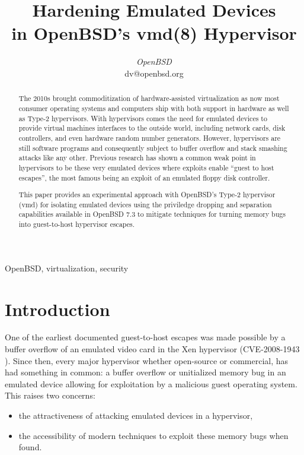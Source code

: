 \documentclass[conference]{IEEEtran}
\begin{document}
\title{Hardening Emulated Devices \\ in OpenBSD's vmd(8) Hypervisor}

\author{
\textit{OpenBSD}\\
dv@openbsd.org}

\maketitle

\begin{abstract}
The 2010s brought commoditization of hardware-assisted virtualization
as now most consumer operating systems and computers ship with both
support in hardware as well as Type-2 hypervisors. With hypervisors
comes the need for emulated devices to provide virtual machines
interfaces to the outside world, including network cards, disk
controllers, and even hardware random number generators. However,
hypervisors are still software programs and consequently subject to
buffer overflow and stack smashing attacks like any other. Previous
research has shown a common weak point in hypervisors to be these very
emulated devices where exploits enable ``guest to host escapes'', the
most famous being an exploit of an emulated floppy disk controller.

This paper provides an experimental approach with OpenBSD's Type-2
hypervisor (vmd) for isolating emulated devices using the priviledge
dropping and separation capabilities available in OpenBSD 7.3 to
mitigate techniques for turning memory bugs into guest-to-host
hypervisor escapes.
\end{abstract}


\begin{IEEEkeywords}
OpenBSD, virtualization, security
\end{IEEEkeywords}

\section{Introduction}
One of the earliest documented guest-to-host escapes was made possible
by a buffer overflow of an emulated video card in the Xen hypervisor
(CVE-2008-1943 \cite{b1}). Since then, every major hypervisor whether
open-source or commercial, has had something in common: a buffer
overflow or unitialized memory bug in an emulated device allowing for
exploitation by a malicious guest operating system. This raises two
concerns:

\begin{itemize}
\item the attractiveness of attacking emulated devices in a hypervisor,
\item the accessibility of modern techniques to exploit these memory
  bugs when found.
\end{itemize}
\end{document}
